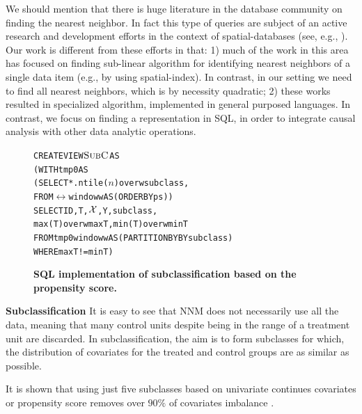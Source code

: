 {We should mention that there is huge literature in the database
community on finding the nearest neighbor. In fact this type of
queries are subject of an active research and development efforts in
the context of spatial-databases (see, e.g.,
\cite{obe2015postgis}). Our work is different from these efforts in that: 1) much of the work in this area has focused on finding sub-linear algorithm for identifying nearest neighbors of a single data item (e.g., by using spatial-index). In contrast, in our setting
we need to find all nearest neighbors, which is by necessity quadratic; 2) these works resulted in specialized algorithm,
implemented in general purposed languages. In contrast, we focus on finding a representation in SQL, in order to integrate causal
 analysis with other data analytic operations.  }









\begin{figure}
\begin{alltt} \scriptsize
CREATE VIEW \(\sbc\) AS
(WITH tmp0 AS
  (SELECT *. ntile(\(n\)) over w subclass,
   FROM \(\rel\) window w AS (ORDER BY ps))
SELECT ID, T, \(\ccv\), Y, subclass,
             max(T) over w maxT, min(T) over w minT
FROM tmp0  window w AS (PARTITION BY BY subclass)
WHERE maxT!=minT)
\end{alltt}
\vspace{-0.3cm}
  \caption{\bf{SQL implementation of subclassification based on the
      propensity score.}}\label{fig:subpr}
\end{figure}


{\bf Subclassification}
\label{sec:sub}
It is easy to see that NNM does not necessarily use all the data,
meaning that many control units despite being in the range of a
treatment unit are discarded.  In subclassification, the aim is to
form subclasses for which, the distribution of covariates for the
treated and control groups are as similar as possible.  It is shown that using just five subclasses based
on univariate continues covariates or propensity score removes over
$90\%$ of covariates imbalance \cite{cochran1968effectiveness,
  rosenbaum1984reducing}.

